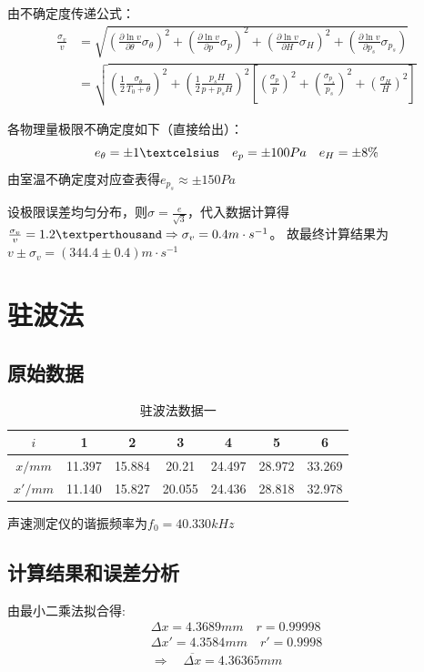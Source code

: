 \documentclass[12pt, a4paper]{ctexart}
\begin{document}
由不确定度传递公式：
\begin{align*}
  \frac{\sigma_v}v
  &= \sqrt{(\frac{\partial \ln v}{\partial \theta}\sigma_{\theta})^2 + (\frac{\partial \ln v}{\partial p}\sigma_p)^2 + (\frac{\partial \ln v}{\partial H}\sigma_H)^2 + (\frac{\partial \ln v}{\partial p_s}\sigma_{p_s})}\\
  &= \sqrt{(\frac12 \frac{\sigma_{\theta}}{T_0 + \theta})^2 + (\frac12 \frac{p_s H}{p + p_s H})^2[(\frac{\sigma_p}{p})^2 + (\frac{\sigma_{p_s}}{p_s})^2 + (\frac{\sigma_H}{H})^2] }
\end{align*}

各物理量极限不确定度如下（直接给出）：
\[
  e_{\theta} = \pm 1 \textcelsius \quad e_p = \pm 100 Pa \quad e_H = \pm 8 \%
\]
由室温不确定度对应查表得$e_{p_s} \approx \pm 150 Pa$

设极限误差均匀分布，则$\sigma = \frac{e}{\sqrt3}$，代入数据计算得$\frac{\sigma_v}{v} = 1.2\textperthousand \Rightarrow \sigma_v = 0.4m \cdot s^{-1}$。
故最终计算结果为$v \pm \sigma_v = (344.4 \pm 0.4)m \cdot s^{-1}$

\section{驻波法}
\subsection{原始数据}

\begin{table}[htbp]
  \centering
  \caption{驻波法数据一}
    \begin{tabular}{ccccccc}
    \toprule
    $i$     & 1     & 2     & 3     & 4     & 5     & 6 \\
    \midrule
    $x/mm$  & 11.397 & 15.884 & 20.21 & 24.497 & 28.972 & 33.269 \\
    $x'/mm$ & 11.140 & 15.827 & 20.055 & 24.436 & 28.818 & 32.978 \\
    \bottomrule
    \end{tabular}
  \label{tab:t2}
\end{table}
声速测定仪的谐振频率为$f_0 = 40.330kHz$

\subsection{计算结果和误差分析}
由最小二乘法拟合得:
\begin{gather*}
  \Delta x = 4.3689mm \quad r = 0.99998\\
  \Delta x' = 4.3584mm \quad r' = 0.9998\\
  \Rightarrow \quad \overline{\Delta x} = 4.36365mm 
\end{gather*}
\end{document}
